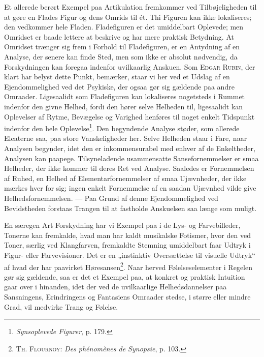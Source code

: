 \documentclass[12pt]{article}
\newcommand{\opage}[1]{\marginnote{\footnotesize\textit{[#1]}}}
\begin{document}
Et allerede berørt Exempel paa Artikulation fremkommer ved Tilbøjeligheden
til at gøre en Flades Figur og dens Omrids til ét. Thi Figuren kan ikke
lokaliseres; den vedkommer hele Fladen. Fladefiguren er det umiddelbart Oplevede; men
Omridset er baade lettere at beskrive og har mere praktisk Betydning. At
Omridset trænger sig frem i Forhold til Fladefiguren, er en Antydning af en Analyse,
der senere kan finde Sted, men som ikke er absolut nødvendig, da Forskydningen
kan foregaa indenfor uvilkaarlig Anskuen. Som \textsc{Edgar Rubin}, der klart har belyst
dette Punkt, bemærker, staar vi her ved et Udslag af en Ejendommelighed ved det
Psykiske, der ogsaa gør sig gældende paa andre Omraader. Ligesaalidt som
Fladefiguren kan lokaliseres nogetsteds i Rummet indenfor den givne Helhed, fordi den
hører selve Helheden til, ligesaalidt kan Oplevelser af Rytme, Bevægelse og
Varighed henføres til noget enkelt Tidspunkt indenfor den hele
Oplevelse\footnote{\textit{Synsoplevede Figurer}, p. 179.}. Den begyndende
Analyse støder, som allerede Eleaterne saa, paa store Vanskeligheder
her. Selve Helheden staar i Fare, naar Analysen begynder, idet den er
inkommensurabel med enhver af de Enkeltheder, Analysen kan paapege. Tilsyneladende
usammensatte Sansefornemmelser er smaa Helheder, der ikke kommer til deres Ret ved
Analyse. Saaledes er Fornemmelsen af Ruhed, en Helhed af Elementarfornemmelser
af smaa Ujævnheder, der ikke mærkes hver for sig; ingen enkelt Fornemmelse af
en saadan Ujævnhed vilde give Helhedsfornemmelsen. --- Paa Grund af denne
Ejendommelighed ved Bevidstheden forstaas Trangen til at fastholde Anskuelsen
saa længe som muligt.

En særegen Art Forskydning har vi Exempel paa i de Lys- og Farvebilleder,
Tonerne kan fremkalde, hvad man har kaldt musikalske Fotismer, hvor den ved
Toner, særlig ved Klangfarven, fremkaldte Stemning umiddelbart faar Udtryk i
Figur- eller Farvevisioner. Det er en „instinktiv Oversættelse til visuelle Udtryk“
\setcounter{footnote}{0}%
\opage{25}af hvad der har paavirket Høresansen\footnote{\textsc{Th. Flournoy}:
\textit{Des phénomènes de Synopsie}, p. 103.}. Naar herved Følelseselementer i Regelen
gør sig gældende, saa er det et Exempel paa, at konkret og praktisk Intuition gaar
over i hinanden, idet der ved de uvilkaarlige Helhedsdannelser paa Sansningens,
Erindringens og Fantasiens Omraader stedse, i større eller mindre Grad, vil
medvirke Trang og Følelse.
\end{document}
